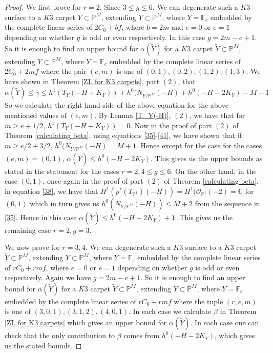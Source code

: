 \documentclass[11pt,twoside]{amsart}
\theoremstyle{plain}
\numberwithin{equation}{section}
\theoremstyle{definition}
\begin{document}
\begin{proof}
We first prove for $r = 2$. Since $3 \leq g \leq 6$. We can degenerate such a $K3$ surface to a $K3$ carpet $\widetilde{Y} \subset \mathbb{P}^M$, extending $Y \subset \mathbb{P}^M$, where $Y = \mathbb{F}_e$ embedded by the complete linear series of $2C_0+bf$, where $b = 2m$ and $e = 0$ or $e = 1$ depending on whether $g$ is odd or even respectively. In this case $g = 2m-e+1$. So it is enough to find an upper bound for $\alpha(\widetilde{Y})$ for a $K3$ carpet $\widetilde{Y} \subset \mathbb{P}^M$, extending $Y \subset \mathbb{P}^M$, where $Y = \mathbb{F}_e$ embedded by the complete linear series of $2C_0+2mf$ where the pair $(e,m)$ is one of $(0,1), (0,2), (1,2), (1,3)$. We have shown in Theorem \ref{ZL for K3 carpets}, part $(2)$, that $$\alpha(\widetilde{Y})  \leq  \gamma \leq h^1(T_Y(-H+K_Y))+h^0(N_{Y/\mathbb{P}^M}(-H)+h^0(-H-2K_Y)-M-1 $$
So we calculate the right hand side of the above equation for the above mentioned values of $(e,m)$. By Lemma \ref{T_Y(-H)}, $(2)$, we have that for $m \geq e+1/2$, $h^1(T_Y(-H+K_Y)) = 0$. Now in the proof of part $(2)$ of Theorem \ref{calculating beta}, using equations \ref{35}-\ref{41}, we have shown that if $m \geq e/2+3/2$, $h^0(N_{Y/\mathbb{P}^M}(-H) = M+1$. Hence except for the case for the cases $(e,m) = (0,1)$, $\alpha(\widetilde{Y}) \leq h^0(-H-2K_Y)$. This gives us the upper bounds as stated in the statement for the cases $r = 2, 4 \leq g \leq 6$. On the other hand, in the case $(0,1)$, once again in the proof of part $(2)$ of Theorem \ref{calculating beta}, in equation \ref{38}, we have that $H^1(p^*(T_{\mathbb{P}^1})(-H)) = H^1(\mathcal{O}_{\mathbb{P}^1}(-2) = \mathbb{C}$ for $(0,1)$ 
which in turn gives us $h^0(N_{Y/\mathbb{P}^M}(-H)) \leq M+2$ 
from the sequence in \ref{35}. Hence in this case $\alpha(\widetilde{Y}) \leq h^0(-H-2K_Y)+1$.
This gives us the remaining case $r = 2, g = 3$. 

We now prove for $r = 3,4$. We can degenerate such a $K3$ surface to a $K3$ carpet $\widetilde{Y} \subset \mathbb{P}^M$, extending $Y \subset \mathbb{P}^M$, where $Y = \mathbb{F}_e$ embedded by the complete linear series of $rC_0+rmf$, where $e = 0$ or $e = 1$ depending on whether $g$ is odd or even respectively. Again we have $g = 2m-e+1$. So it is enough to find an upper bound for $\alpha(\widetilde{Y})$ for a $K3$ carpet $\widetilde{Y} \subset \mathbb{P}^M$, extending $Y \subset \mathbb{P}^M$, where $Y = \mathbb{F}_e$ embedded by the complete linear series of $rC_0+rmf$ where the tuple $(r,e,m)$ is one of $(3,0,1), (3,1,2), (4,0,1)$. In each case we calculate $\beta$ in Theorem \ref{ZL for K3 carpets} which gives an upper bound for $\alpha(\widetilde{Y})$. In each case 
one can check that the only contribution to $\beta$ comes from $h^0(-H-2K_Y)$, which gives us the stated bounds. 
\end{proof}
\end{document}

